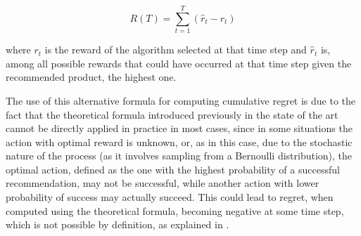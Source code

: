\documentclass[../main.tex]{subfiles}
\begin{document}
\begin{equation*}
    R\left(T\right) = \sum_{t=1}^{T}\left(\hat{r}_{t} - r_{t}\right)
\end{equation*}

where $r_{t}$ is the reward of the algorithm selected at that time step and 
$\hat{r}_{t}$ is, among all possible rewards that could have occurred at that 
time step given the recommended product, the highest one.  
 
The use of this alternative formula for computing cumulative regret is due to the 
fact that the theoretical formula introduced previously in the state of the art cannot 
be directly applied in practice in most cases, since in some situations the action with 
optimal reward is unknown, or, as in this case, due to the stochastic nature of the 
process (as it involves sampling from a Bernoulli distribution), the optimal action, 
defined as the one with the highest probability of a successful recommendation, may not 
be successful, while another action with lower probability of success may actually succeed. 
This could lead to regret, when computed using the theoretical formula, becoming negative 
at some time step, which is not possible by definition, as explained in \textcite{loomes1982}.  
\end{document}
